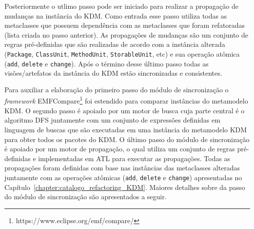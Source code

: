 Posteriormente o utlimo passo pode ser iniciado para realizar a propagação de mudanças na instância do KDM. Como entrada esse passo utiliza todas as metaclasses que possuem dependência com as metaclasses que foram refatoradas (lista criada no passo anterior). As propagações de mudanças são um conjunto de regras pré-definidas que são realizadas de acordo com a instância alterada (\texttt{Package}, \texttt{ClassUnit}, \texttt{MethodUnit}, \texttt{StorableUnit}, etc) e sua operação atômica (\texttt{add}, \texttt{delete} e \texttt{change}). Após o término desse último passo todas as visões/artefatos da instância do KDM estão sincronizadas e consistentes.


Para auxiliar a elaboração do primeiro passo do módulo de sincronização o \textit{framework} EMFCompare\footnote{https://www.eclipse.org/emf/compare/} foi estendido para comparar instâncias do metamodelo KDM. O segundo passo é apoiado por um motor de busca cuja parte central é o algoritmo DFS juntamente com um conjunto de expressões definidas em linguagem de buscas que são executadas em uma instância do metamodelo KDM para obter todos os pacotes do KDM. O último passo do módulo de sincronização é apoiado por um motor de propagação, o qual utiliza um conjunto de regras pré-definidas e implementadas em ATL para executar as propagações. Todas as propagações foram definidas com base nas instâncias das metaclasses alteradas juntamente com as operações atômicas (\texttt{add}, \texttt{delete} e \texttt{change}) apresentadas no Capítulo~\ref{chapter:catalogo_refactoring_KDM}. Maiores detalhes sobre da passo do módulo de sincronização são apresentados a seguir. %

